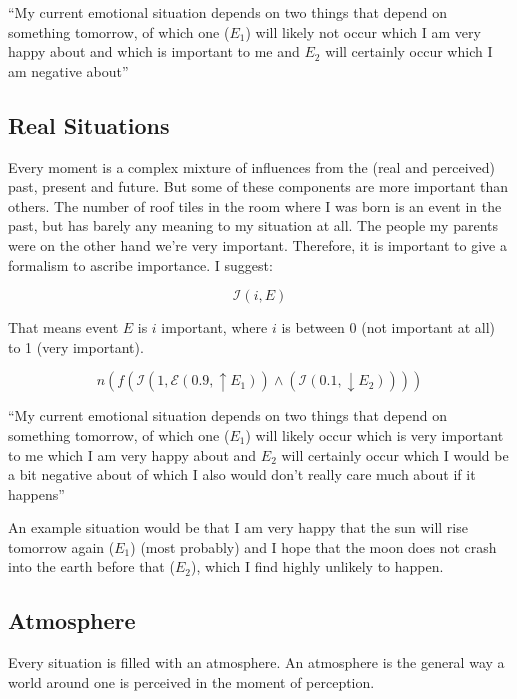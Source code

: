 \documentclass{scrartcl}
\begin{document}
``My current emotional situation depends on two things that depend on something tomorrow, of which one ($E_1$) will likely not
occur which I am very happy about and which is important to me and $E_2$ will certainly occur which I am negative about''

\subsection{Real Situations}

Every moment is a complex mixture of influences from the (real and perceived) past, present and future. But some
of these components are more important than others. The number of roof tiles in the room where I was born is
an event in the past, but has barely any meaning to my situation at all. The people my parents were on the other
hand we're very important. Therefore, it is important to give a formalism to ascribe importance. I suggest:

\begin{equation} \mathcal{I}(i, E) \end{equation}

That means event $E$ is $i$ important, where $i$ is between 0 (not important at all) to 1 (very important).

\begin{equation} n 
	\left(
		f \left(
			\mathcal{I}\left(
				1, \mathcal{E}\left(
					0.9, \uparrow E_1
				\right)
			\right)
			\wedge
			\left(
				\mathcal{I}\left(
					0.1, \downarrow E_2
				\right)
			\right)
		\right)
	\right) 
\end{equation}

``My current emotional situation depends on two things that depend on something tomorrow, of which one ($E_1$) will likely
occur which is very important to me which I am very happy about and $E_2$ will certainly occur which I would be a bit negative about
of which I also would don't really care much about if it happens''

An example situation would be that I am very happy that the sun will rise tomorrow again ($E_1$) (most probably) and I hope that the moon
does not crash into the earth before that ($E_2$), which I find highly unlikely to happen.

\subsection{Atmosphere}

Every situation is filled with an atmosphere. An atmosphere is the general way a world around one is perceived in the moment of perception.
\end{document}
